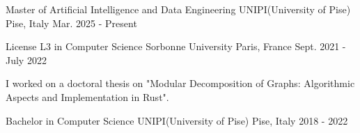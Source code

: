 

\begin{cventries}

  \cventry
    {Master of Artificial Intelligence and Data Engineering} %
    {UNIPI(University of Pise)} %
    {Pise, Italy} %
    {Mar. 2025 - Present} %
    {}


  \cventry
    {License L3 in Computer Science} %
    {Sorbonne University} %
    {Paris, France} %
    {Sept. 2021 - July 2022} %
    {
      \begin{cvitems} %
        \item {I worked on a doctoral thesis on "Modular Decomposition of Graphs: Algorithmic Aspects and Implementation in Rust".}
      \end{cvitems}
    }


  \cventry
    {Bachelor in Computer Science} %
    {UNIPI(University of Pise)} %
    {Pise, Italy} %
    {2018 - 2022} %
    {}

\end{cventries}
